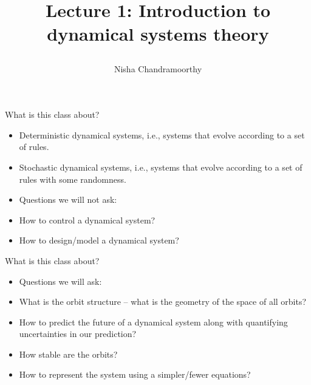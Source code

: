 \documentclass[final]{beamer}
\title{\begin{huge}{Lecture 1: Introduction to dynamical systems theory}\end{huge}} %
\author{Nisha Chandramoorthy} %
\begin{document}
\frame{\titlepage}

\begin{frame}{What is this class about?}
	\begin{itemize}
	\item Deterministic dynamical systems, i.e., systems that evolve according to a set of rules.
	\pause 
	\item Stochastic dynamical systems, i.e., systems that evolve according to a set of rules with some randomness.
	\pause
\item Questions we will not ask:
	\pause 
	\item How to control a dynamical system?
	\item How to design/model a dynamical system?
	\end{itemize}
\end{frame}
\begin{frame}{What is this class about?}
	\begin{itemize}
		\item Questions we will ask:
		\pause
		\item What is the orbit structure -- what is the geometry of the space of all orbits?
		\pause
		\item How to predict the future of a dynamical system along with quantifying uncertainties in our prediction?
		\pause
		\item How stable are the orbits?
		\pause
		\item How to represent the system using a simpler/fewer equations?
	\end{itemize}
\end{frame}
\end{document}
